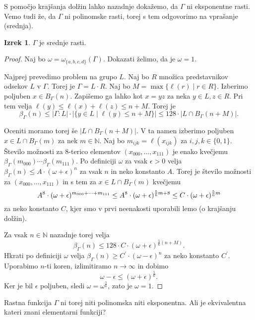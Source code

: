 \documentclass[11pt]{book}
\def\NN{\mathbb{N}}
\def\vprasanje{\color{oranzna}}
\theoremstyle{definition}
\theoremstyle{zgled}
\theoremstyle{odprtproblem}
\theoremstyle{domacanaloga}
\newenvironment{dokaz}
    {\color{siva}\begin{proof}}
    {\end{proof}}
\theoremstyle{izrek}
\newtheorem*{izrek}{Izrek}
\begin{document}
S pomočjo krajšanja dolžin lahko nazadnje dokažemo, da $\Gamma$ ni eksponentne rasti. Vemo tudi že, da $\Gamma$ ni polinomske rasti, torej s tem odgovorimo na vprašanje {\vprasanje \sc (srednja)}.

\begin{izrek}
$\Gamma$ je srednje rasti.
\end{izrek}

\begin{dokaz}
Naj bo $\omega = \omega_{\{ a,b,c,d \}}(\Gamma)$. Dokazati želimo, da je $\omega = 1$.

Najprej prevedimo problem na grupo $L$. Naj bo $R$ množica predstavnikov odsekov $L$ v $\Gamma$. Torej je $\Gamma = L \cdot R$. Naj bo $M = \max \{ \ell(r) \mid r \in R \}$. Izberimo poljuben $x \in B_{\Gamma}(n)$. Zapišemo ga lahko kot $x = yz$ za neka $y \in L, z \in R$. Pri tem velja $\ell(y) \leq \ell(x) + \ell(z) \leq n + M$. Torej je
\[
\beta_\Gamma(n) \leq |\Gamma : L| \cdot |\{ y \in L \mid \ell(y) \leq n+M \}| 
\leq 128 \cdot |L \cap B_\Gamma(n+M)|.
\]

Oceniti moramo torej še $|L \cap B_\Gamma(n+M)|$. V ta namen izberimo poljuben $x \in L \cap B_\Gamma(m)$ za nek $m \in \NN$. Naj bo $m_{ijk} = \ell(x_{ijk})$ za $i,j,k \in \{0,1\}$. Število možnosti za 8-terico elementov $(x_{000}, \dots, x_{111})$ je enako kvečjemu $\beta_\Gamma(m_{000}) \cdots \beta_\Gamma(m_{111})$. Po definiciji $\omega$ za vsak $\epsilon > 0$ velja $\beta_\Gamma(n) \leq A \cdot (\omega + \epsilon)^n$ za vsak $n$ in neko konstanto $A$. Torej je število možnosti za $(x_{000}, \dots, x_{111})$ in s tem za $x \in L \cap B_\Gamma(m)$ kvečjemu
\[
A^8 \cdot (\omega + \epsilon)^{m_{000} + \cdots + m_{111}} 
\leq A^8 \cdot (\omega + \epsilon)^{\frac56 m + 8} \\
\leq C \cdot (\omega + \epsilon)^{\frac56 m}
\]
za neko konstanto $C$, kjer smo v prvi neenakosti uporabili lemo {\sc (o krajšanju dolžin)}. 

Za vsak $n \in \NN$ nazadnje torej velja
\[
\beta_\Gamma(n) \leq 128 \cdot C \cdot (\omega + \epsilon)^{\frac56 (n+M)}.
\]
Hkrati po definiciji $\omega$ velja $\beta_\Gamma(n) \geq C^\prime \cdot (\omega - \epsilon)^n$ za neko konstanto $C^\prime$. Uporabimo $n$-ti koren, izlimitiramo $n \to \infty$ in dobimo
\[
\omega - \epsilon \leq (\omega + \epsilon)^{\frac56}.
\]
Ker je bil $\epsilon$ poljuben, sledi $\omega = \omega^{\frac56}$, zato je $\omega = 1$.
\end{dokaz}

Rastna funkcija $\Gamma$ ni torej niti polinomska niti eksponentna. {\vprasanje Ali je ekvivalentna kateri znani elementarni funkciji?}
\end{document}
